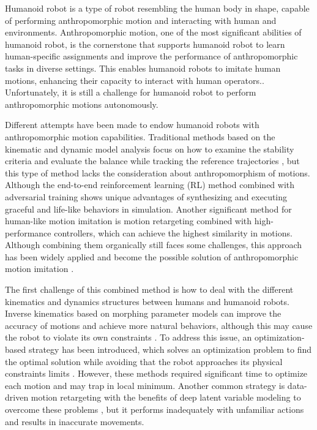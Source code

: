 \documentclass[a4paper, 10pt, conference]{ieeeconf}      %
\begin{document}
Humanoid robot is a type of robot resembling the human body in shape, capable of performing anthropomorphic motion and interacting with human and environments. Anthropomorphic motion, one of the most significant abilities of humanoid robot, is the cornerstone that supports humanoid robot to learn human-specific assignments and improve the performance of anthropomorphic tasks in diverse settings. This enables humanoid robots to imitate human motions, enhancing their capacity to interact with human operators.\cite{c1,c9}. Unfortunately, it is still a challenge for humanoid robot to perform anthropomorphic motions autonomously. 

Different attempts have been made to endow humanoid robots with anthropomorphic motion capabilities. Traditional methods based on the kinematic and dynamic model analysis focus on how to examine the stability criteria and evaluate the balance while tracking the reference trajectories \cite{c14,c16}, but this type of method lacks the consideration about anthropomorphism of motions. Although the end-to-end reinforcement learning (RL) method combined with adversarial training shows unique advantages of synthesizing and executing graceful and life-like behaviors in simulation\cite{c11,c12}. Another significant method for human-like motion imitation is motion retargeting combined with high-performance controllers, which can achieve the highest similarity in motions. Although combining them organically still faces some challenges, this approach has been widely applied and become the possible solution of anthropomorphic motion imitation \cite{c17}.

The first challenge of this combined method is how to deal with the different kinematics and dynamics structures between humans and humanoid robots. Inverse kinematics based on morphing parameter models can improve the accuracy of motions and achieve more natural behaviors, although this may cause the robot to violate its own constraints \cite{c5,c6,c8}. To address this issue, an optimization-based strategy has been introduced, which solves an optimization problem to find the optimal solution while avoiding that the robot approaches its physical constraints limits \cite{c2,c7}. However, these methods required significant time to optimize each motion and may trap in local minimum. Another common strategy is data-driven motion retargeting with the benefits of deep latent variable modeling to overcome these problems \cite{c31}, but it performs inadequately with unfamiliar actions and results in inaccurate movements.
\end{document}
